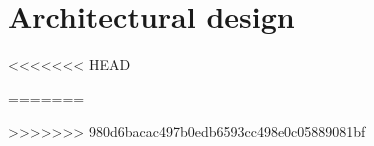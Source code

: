 \chapter{Architectural design}
<<<<<<< HEAD



=======
\label{chap:architectural}
\clearpage


>>>>>>> 980d6bacac497b0edb6593cc498e0c05889081bf
